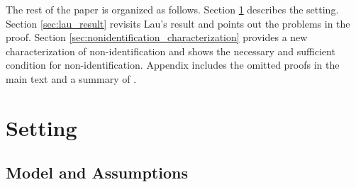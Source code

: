 \documentclass[11pt, a4paper]{article}
\theoremstyle{remark}
\begin{document}
The rest of the paper is organized as follows.
Section \ref{sec:setting} describes the setting.
Section \ref{sec:lau_result} revisits Lau's result and points out the problems in the proof.
Section \ref{sec:nonidentification_characterization} provides a new characterization of non-identification and shows the necessary and sufficient condition for non-identification.
Appendix includes the omitted proofs in the main text and a summary of \citet{goldmanNote1964}.


















\section{Setting}\label{sec:setting}

\subsection{Model and Assumptions}
\end{document}
